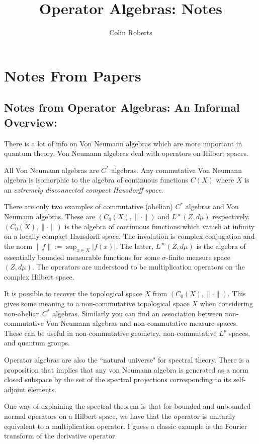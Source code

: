 \documentclass[leqno]{article}
\author{Colin Roberts}
\title{Operator Algebras: Notes}
\theoremstyle{definition}
\theoremstyle{remark}
\theoremstyle{theorem}
\begin{document}
\maketitle
\tableofcontents
\pagebreak

\section{Notes From Papers}	

\subsection{Notes from Operator Algebras: An Informal Overview:}  
There is a lot of info on Von Neumann algebras which are more important in quantum theory.  Von Neumann algebras deal with operators on Hilbert spaces.
	
	All Von Neumann algebras are $C^*$ algebras. Any commutative Von Neumann algebra is isomorphic to the algebra of continuous functions $C(X)$ where $X$ is an \emph{extremely disconnected compact Hausdorff space}. 
	
	There are only two examples of commutative (abelian) $C^*$ algebras and Von Neumann algebras. These are $(C_0(X),\|\cdot \|)$ and $L^\infty (Z, d\mu)$ respectively.  $(C_0(X),\|\cdot \|)$ is the algebra of continuous functions which vanish at infinity on a locally compact Hausdorff space. The involution is complex conjugation and the norm $\|f\|:=\sup_{x\in X} |f(x)|$. The latter, $L^\infty (Z,d\mu)$ is the algebra of essentially bounded measurable functions for some $\sigma$-finite measure space $(Z,d\mu)$. The operators are understood to be multiplication operators on the complex Hilbert space.
	
	It is possible to recover the topological space $X$ from $(C_0(X),\|\cdot\|)$.  This gives some meaning to a non-commutative topological space $X$ when considering non-abelian $C^*$ algebras. Similarly you can find an association between non-commutative Von Neumann algebras and non-commutative measure spaces. These can be useful in non-commutative geometry, non-commutative $L^p$ spaces, and quantum groups.
	
	Operator algebras are also the ``natural universe" for spectral theory. There is a proposition that implies that any von Neumann algebra is generated as a norm closed subspace by the set of the spectral projections corresponding to its self-adjoint elements.
	
	One way of explaining the spectral theorem is that for bounded and unbounded normal operators on a Hilbert space, we have that the operator is unitarily equivalent to a multiplication operator.  I guess a classic example is the Fourier transform of the derivative operator.
	
\end{document}
